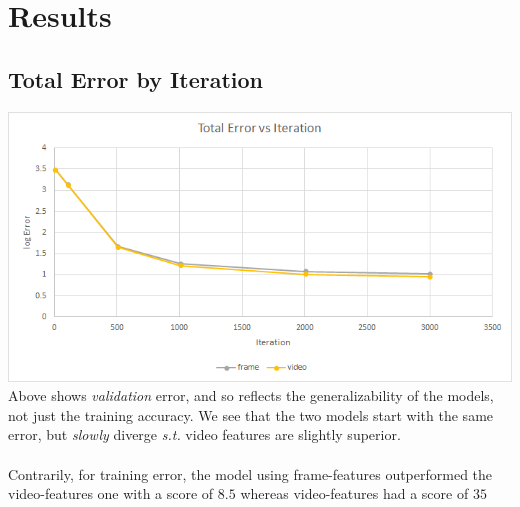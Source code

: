 \documentclass{article}
\begin{document}
\section{Results}

\subsection{Total Error by Iteration}
\includegraphics[scale=1.8]{Error_vs_Step.png} \\
Above shows {\it validation} error, and so reflects the generalizability of the models, not just the training accuracy. We see that the two models start with the same error, but {\it slowly} diverge {\it s.t.} video features are slightly superior.
\\
\\
Contrarily, for training error, the model using frame-features outperformed the video-features one with a score of $8.5$ whereas video-features had a score of $35$ \\
\end{document}
